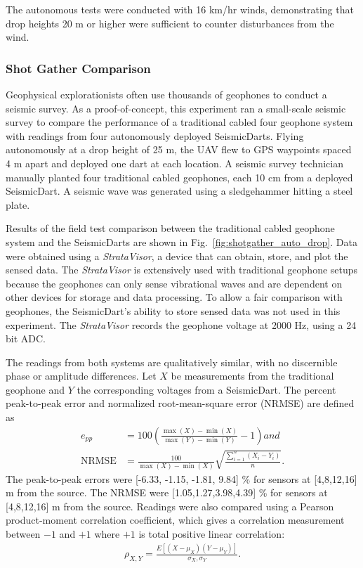 The autonomous tests were conducted with 16 km/hr winds, demonstrating that drop heights 20 m or higher were sufficient to counter disturbances from the wind.

\subsubsection{Shot Gather Comparison}
Geophysical explorationists often use thousands of geophones to conduct a seismic survey.
As a proof-of-concept, this experiment ran a small-scale seismic survey to compare the performance of a traditional cabled four geophone system with readings from four autonomously deployed SeismicDarts.
Flying autonomously at a drop height of 25 m, the UAV flew to GPS waypoints spaced 4 m apart and deployed one dart at each location.
A seismic survey technician manually planted four traditional cabled geophones, each 10 cm from a deployed SeismicDart.
A seismic wave was generated using a sledgehammer hitting a steel plate.

Results of the field test comparison between the traditional cabled geophone system and the SeismicDarts are shown in Fig.~\ref{fig:shotgather_auto_drop}.
Data were obtained using a \emph{StrataVisor}, a device that can obtain, store, and plot the sensed data.
The \emph{StrataVisor} is extensively used with traditional geophone setups because the geophones can only sense vibrational waves and are dependent on other devices for storage and data processing.
To allow a fair comparison with geophones, the SeismicDart's  ability to store sensed data was not used in this experiment.
The \emph{StrataVisor} records the geophone voltage at 2000 Hz, using a 24 bit ADC.

The readings from both systems are qualitatively similar, with no discernible phase or amplitude differences.
Let $X$ be measurements from the traditional geophone and $Y$ the corresponding voltages from a SeismicDart.
The percent peak-to-peak error and normalized root-mean-square error (NRMSE) are defined as
\begin{align}
e_{pp} &= 100 \left( \frac{ \max(X) - \min(X) }{ \max(Y) - \min(Y) } -1\right) and \\
  \text{NRMSE} &=\frac{100}{\max(X) - \min(X)} \sqrt{ \frac{ \sum_{i=1}^n \left( X_i - Y_i \right)}{n} }.
\end{align}
The peak-to-peak errors were [-6.33, -1.15, -1.81,  9.84] \% for sensors at [4,8,12,16] m from the source.
The NRMSE were [1.05,1.27,3.98,4.39] \% for sensors at [4,8,12,16] m from the source.
Readings were also compared using a Pearson product-moment correlation coefficient, which gives a correlation measurement between $-1$ and $+1$ where $+1$ is total positive linear correlation:
\begin{align}
\rho_{X,Y} = \frac{E\left[  (X-\mu_X) (Y-\mu_Y)  \right]}{  \sigma_X, \sigma_Y}.
\end{align}

